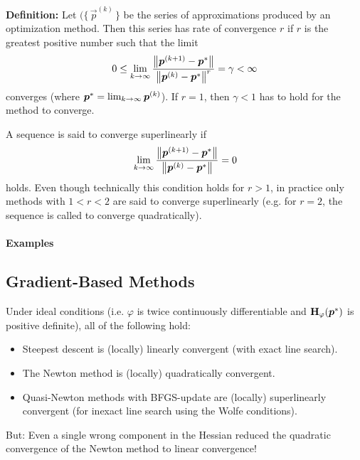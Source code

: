		\textbf{Definition:}
		Let \( \big(\{\, \vec{p}^{(k)} \,\big\} \) be the series of approximations produced by an optimization method. Then this series has rate of convergence \(r\) if \(r\) is the greatest positive number such that the limit
		\begin{align*}
			0 \leq \liminfty[k] \frac{\big\lVert \vec{p}^{(k + 1)} - \vec{p}^\ast \big\rVert}{\big\lVert \vec{p}^{(k)} - \vec{p}^\ast \big\rVert^r} = \gamma < \infty
		\end{align*}
		converges (where \( \vec{p}^\ast = \liminfty[k] \vec{p}^{(k)} \)). If \( r = 1 \), then \( \gamma < 1 \) has to hold for the method to converge.

		A sequence is said to converge superlinearly if
		\begin{align*}
			\liminfty[k] \frac{\big\lVert \vec{p}^{(k + 1)} - \vec{p}^\ast \big\rVert}{\big\lVert \vec{p}^{(k)} - \vec{p}^\ast \big\rVert} = 0
		\end{align*}
		holds. Even though technically this condition holds for \( r > 1 \), in practice only methods with \( 1 < r < 2 \) are said to converge superlinearly (e.g. for \(r = 2\), the sequence is called to converge quadratically).

		\paragraph{Examples} %

		\subsection{Gradient-Based Methods}
			Under ideal conditions (i.e. \(\varphi\) is twice continuously differentiable and \( \mat{H}_\varphi(\vec{p}^\ast) \) is positive definite), all of the following hold:
			\begin{itemize}
				\item Steepest descent is (locally) linearly convergent (with exact line search).
				\item The Newton method is (locally) quadratically convergent.
				\item Quasi-Newton methods with BFGS-update are (locally) superlinearly convergent (for inexact line search using the Wolfe conditions).
			\end{itemize}
			But: Even a single wrong component in the Hessian reduced the quadratic convergence of the Newton method to linear convergence!

